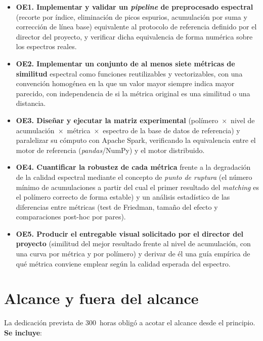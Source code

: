 \begin{itemize}
    \item \textbf{OE1. Implementar y validar un \textit{pipeline} de preprocesado espectral} (recorte por índice, eliminación de picos espurios, acumulación por suma y corrección de línea base) equivalente al protocolo de referencia definido por el director del proyecto, y verificar dicha equivalencia de forma numérica sobre los espectros reales.
    \item \textbf{OE2. Implementar un conjunto de al menos siete métricas de similitud} espectral como funciones reutilizables y vectorizables, con una convención homogénea en la que un valor mayor siempre indica mayor parecido, con independencia de si la métrica original es una similitud o una distancia.
    \item \textbf{OE3. Diseñar y ejecutar la matriz experimental} (polímero~$\times$~nivel de acumulación~$\times$~métrica~$\times$~espectro de la base de datos de referencia) y paralelizar su cómputo con Apache Spark, verificando la equivalencia entre el motor de referencia (\textit{pandas}/NumPy) y el motor distribuido.
    \item \textbf{OE4. Cuantificar la robustez de cada métrica} frente a la degradación de la calidad espectral mediante el concepto de \emph{punto de ruptura} (el número mínimo de acumulaciones a partir del cual el primer resultado del \textit{matching} es el polímero correcto de forma estable) y un análisis estadístico de las diferencias entre métricas (test de Friedman, tamaño del efecto y comparaciones post-hoc por pares).
    \item \textbf{OE5. Producir el entregable visual solicitado por el director del proyecto} (similitud del mejor resultado frente al nivel de acumulación, con una curva por métrica y por polímero) y derivar de él una guía empírica de qué métrica conviene emplear según la calidad esperada del espectro.
\end{itemize}

\section{Alcance y fuera del alcance}

La dedicación prevista de 300~horas obligó a acotar el alcance desde el principio. \textbf{Se incluye}:

